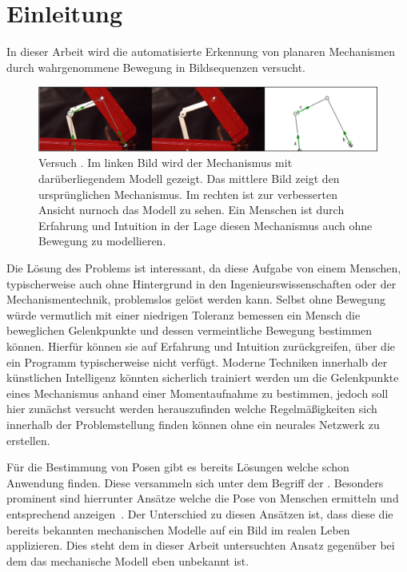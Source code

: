 %

\chapter{Einleitung}
\label{ch:einleitung}

In dieser Arbeit wird die automatisierte Erkennung von planaren Mechanismen durch wahrgenommene Bewegung in Bildsequenzen versucht.

\begin{figure}
\centering
    \includegraphics[width=\textwidth]{gfx/werkzeugkoffer_impl.png}
    \caption[Versuch ]{Versuch . Im linken Bild wird der Mechanismus mit darüberliegendem  Modell gezeigt. Das mittlere Bild zeigt den ursprünglichen Mechanismus. Im rechten ist zur verbesserten Ansicht nurnoch das  Modell zu sehen. Ein Menschen ist durch Erfahrung und Intuition in der Lage diesen Mechanismus auch ohne Bewegung zu modellieren.}\label{fig:werkzeugkoffer_impl}
\end{figure}

Die Lösung des Problems ist interessant, da diese Aufgabe von einem Menschen, typischerweise auch ohne Hintergrund in den Ingenieurswissenschaften oder der Mechanismentechnik, problemslos gelöst werden kann.
Selbst ohne Bewegung würde vermutlich mit einer niedrigen Toleranz bemessen ein Mensch die beweglichen Gelenkpunkte und dessen vermeintliche Bewegung bestimmen können.
Hierfür können sie auf Erfahrung und Intuition zurückgreifen, über die ein Programm typischerweise nicht verfügt.
Moderne Techniken innerhalb der künstlichen Intelligenz könnten sicherlich trainiert werden um die Gelenkpunkte eines Mechanismus anhand einer Momentaufnahme zu bestimmen, jedoch soll hier zunächst versucht werden herauszufinden welche Regelmä{\ss}igkeiten sich innerhalb der Problemstellung finden können ohne ein neurales Netzwerk zu erstellen.

Für die Bestimmung von Posen gibt es bereits Lösungen welche schon Anwendung finden.
Diese versammeln sich unter dem Begriff der .
Besonders prominent sind hierrunter Ansätze welche die Pose von Menschen ermitteln und entsprechend anzeigen~\cite{Papandreou2018, Google2021, Google2021a}.
Der Unterschied zu diesen Ansätzen ist, dass diese die bereits bekannten mechanischen Modelle auf ein Bild im realen Leben applizieren.
Dies steht dem in dieser Arbeit untersuchten Ansatz gegenüber bei dem das mechanische Modell eben unbekannt ist.

